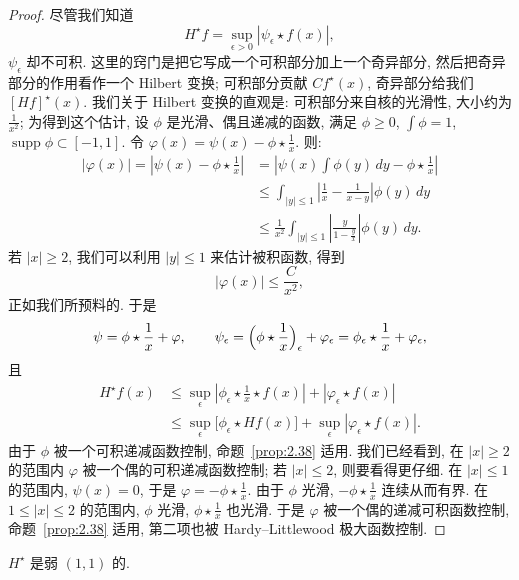 \begin{proof}
尽管我们知道
\[
H^{\star}f=\sup_{\epsilon>0}|\psi_{\epsilon}\star f(x)|,
\]
$\psi_{\epsilon}$ 却不可积. 这里的窍门是把它写成一个可积部分加上一个奇异部分, 然后把奇异部分的作用看作一个 Hilbert 变换; 可积部分贡献 $Cf^\star(x)$, 奇异部分给我们 $[Hf]^\star(x)$. 我们关于 Hilbert 变换的直观是: 可积部分来自核的光滑性, 大小约为 $\frac{1}{x^{2}}$; 为得到这个估计, 设 $\phi$ 是光滑、偶且递减的函数, 满足 $\phi\geq 0$, $\int\phi=1$, $\operatorname{supp}\phi\subset[-1,1]$. 令 $\varphi(x)=\psi(x)-\phi\star\frac{1}{x}$. 则:
\begin{align*}
|\varphi(x)|=\left|\psi(x)-\phi\star\frac{1}{x}\right|
&=\left|\psi(x)\int\phi(y)\,dy-\phi\star\frac{1}{x}\right| \\
&\leq\int_{|y|\leq1}\left|\frac{1}{x}-\frac{1}{x-y}\right|\phi(y)\,dy \\
&\leq\frac{1}{x^{2}}\int_{|y|\leq1}\left|\frac{y}{1-\frac{y}{x}}\right|\phi(y)\,dy.
\end{align*}
若 $|x|\geq 2$, 我们可以利用 $|y|\leq 1$ 来估计被积函数, 得到
\[
|\varphi(x)|\leq\frac{C}{x^{2}},
\]
正如我们所预料的. 于是
\[
\psi=\phi\star\frac{1}{x}+\varphi,
\qquad
\psi_{\epsilon}=\Bigl(\phi\star\frac{1}{x}\Bigr)_{\epsilon}+\varphi_{\epsilon}
=\phi_{\epsilon}\star\frac{1}{x}+\varphi_{\epsilon},
\]
且
\begin{align*}
H^{\star}f(x)&\leq\sup_{\epsilon}\left|\phi_{\epsilon}\star\frac{1}{x}\star f(x)\right|+\left|\varphi_{\epsilon}\star f(x)\right| \\
&\leq\sup_{\epsilon}\bigl[\phi_{\epsilon}\star H f(x)\bigr]+\sup_{\epsilon}\left|\varphi_{\epsilon}\star f(x)\right|.
\end{align*}
由于 $\phi$ 被一个可积递减函数控制, 命题~\ref{prop:2.38} 适用. 我们已经看到, 在 $|x|\geq 2$ 的范围内 $\varphi$ 被一个偶的可积递减函数控制; 若 $|x|\leq 2$, 则要看得更仔细. 在 $|x|\leq 1$ 的范围内, $\psi(x)=0$, 于是 $\varphi=-\phi\star\frac{1}{x}$. 由于 $\phi$ 光滑, $-\phi\star\frac{1}{x}$ 连续从而有界. 在 $1\leq|x|\leq 2$ 的范围内, $\phi$ 光滑, $\phi\star\frac{1}{x}$ 也光滑. 于是 $\varphi$ 被一个偶的递减可积函数控制, 命题~\ref{prop:2.38} 适用, 第二项也被 Hardy--Littlewood 极大函数控制.
\end{proof}

\begin{theorem}\label{thm:2.40}
$H^{\star}$ 是弱 $(1,1)$ 的.
\end{theorem}

